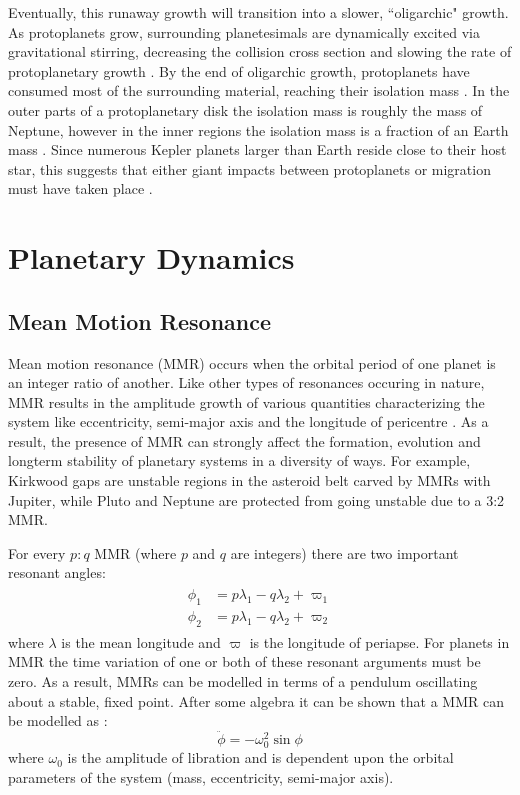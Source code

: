 Eventually, this runaway growth will transition into a slower, ``oligarchic" growth. 
As protoplanets grow, surrounding planetesimals are dynamically excited via gravitational stirring, decreasing the collision cross section and slowing the rate of protoplanetary growth \citep{Kokubo1998}.
By the end of oligarchic growth, protoplanets have consumed most of the surrounding material, reaching their isolation mass \citep{Schlichting2014}.
In the outer parts of a protoplanetary disk the isolation mass is roughly the mass of Neptune, however in the inner regions the isolation mass is a fraction of an Earth mass \citep{Schlichting2014}.
Since numerous Kepler planets larger than Earth reside close to their host star, this suggests that either giant impacts between protoplanets or migration must have taken place \citep{Schlichting2014}.  

\section{Planetary Dynamics}
\subsection{Mean Motion Resonance}
\label{sec:MMR}
Mean motion resonance (MMR) occurs when the orbital period of one planet is an integer ratio of another. 
Like other types of resonances occuring in nature, MMR results in the amplitude growth of various quantities characterizing the system like eccentricity, semi-major axis and the longitude of pericentre \citep{SSD1999}. 
As a result, the presence of MMR can strongly affect the formation, evolution and longterm stability of planetary systems in a diversity of ways.
For example, Kirkwood gaps are unstable regions in the asteroid belt carved by MMRs with Jupiter, while Pluto and Neptune are protected from going unstable due to a 3:2 MMR. 

For every $p:q$ MMR (where $p$ and $q$ are integers) there are two important resonant angles:
\begin{align}
\begin{split}
\phi_1 &= p\lambda_1 - q\lambda_2 + \varpi_1 \\
\phi_2 &= p\lambda_1 - q\lambda_2 + \varpi_2 
\label{eq:MMR}
\end{split}
\end{align}
where $\lambda$ is the mean longitude and $\varpi$ is the longitude of periapse. 
For planets in MMR the time variation of one or both of these resonant arguments must be zero.
As a result, MMRs can be modelled in terms of a pendulum oscillating about a stable, fixed point. 
After some algebra it can be shown that a MMR can be modelled as \citep{SSD1999}:
\begin{equation}
\ddot{\phi} = -\omega_0^2 \sin\phi
\label{eq:pendulum}
\end{equation}
where $\omega_0$ is the amplitude of libration and is dependent upon the orbital parameters of the system (mass, eccentricity, semi-major axis).

